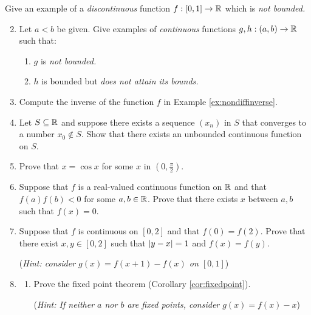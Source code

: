 \begin{exercisessec}{}{}
\exstart Give an example of a \emph{discontinuous} function $f:[0,1]\to\mathbb{R}$ which is \emph{not bounded.}
\begin{enumerate}\setcounter{enumi}{1}
  \item Let $a<b$ be given. Give examples of \emph{continuous} functions $g,h:(a,b)\to\mathbb{R}$ such that:
	\begin{enumerate}
		 \item $g$ is \emph{not bounded.}
		 \item $h$ is bounded but \emph{does not attain its bounds.}
	\end{enumerate}
	
  
  \item Compute the inverse of the function $f$ in Example \ref{ex:nondiffinverse}.
  
  \item%
  Let $S\subseteq\mathbb{R}$ and suppose there exists a sequence $(x_n)$ in $S$ that converges to a number $x_0\not\in S$. Show that there exists an unbounded continuous function on $S$.
  
  \item%
  Prove that $x=\cos x$ for some $x$ in $(0,\tfrac\pi 2)$.
  
  \item%
  Suppose that $f$ is a real-valued continuous function on $\mathbb{R}$ and that $f(a)f(b)<0$ for some $a,b\in\mathbb{R}$. Prove that there exists $x$ between $a,b$ such that $f(x)=0$.
  
  \item%
  Suppose that $f$ is continuous on $[0,2]$ and that $f(0)=f(2)$. Prove that there exist $x,y\in[0,2]$ such that $\left| y-x\right|=1$ and $f(x)=f(y)$.\par
  (\emph{Hint: consider $g(x)=f(x+1)-f(x)$ on $[0,1]$})
  
  
  
 	\item\begin{enumerate}
 	  \item Prove the fixed point theorem (Corollary \ref{cor:fixedpoint}).\par
 	  (\emph{Hint: If neither $a$ nor $b$ are fixed points, consider $g(x)=f(x)-x$}) 
 	  

\end{enumerate}
\end{enumerate}
\end{exercisessec}
